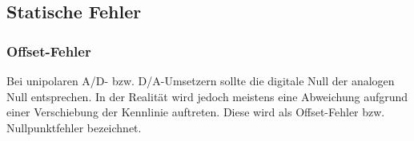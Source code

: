 \subsection{Statische Fehler }
\subsubsection{Offset-Fehler }
Bei unipolaren A/D- bzw. D/A-Umsetzern sollte die digitale Null der
analogen Null entsprechen. In der Realität wird jedoch meistens eine Abweichung
aufgrund einer Verschiebung der Kennlinie auftreten. Diese wird als
Offset-Fehler bzw. Nullpunktfehler bezeichnet.
\begin{figure}[!ht]
\begin{center}
\end{center}
\end{figure}

